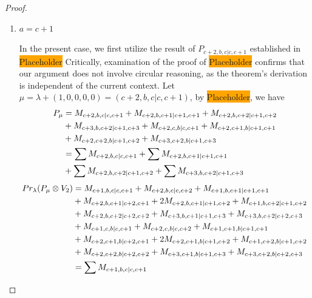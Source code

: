 \begin{proof}
\begin{enumerate}
\begin{enumerate}
      \item $a=c+1$\par
        In the present case, we first utilize the result of $P_{c+2,b,c|c,c+1}$ established in \colorbox{orange}{Placeholder} Critically, examination of the proof of \colorbox{orange}{Placeholder} confirms that our argument does not involve circular reasoning, as the theorem's derivation is independent of the current context. Let $\mu = \lambda + (1,0,0,0,0) =(c+2,b,c|c,c+1) $, by \colorbox{orange}{Placeholder}, we have
        \begin{equation}\notag
          \begin{aligned}
            P_\mu &= 
M_{c+2,b,c|c,c+1}
+M_{c+2,b,c+1|c+1,c+1}
+M_{c+2,b,c+2|c+1,c+2}\\ 
                                              &
+M_{c+3,b,c+2|c+1,c+3}
+M_{c+2,c,b|c,c+1}
+M_{c+2,c+1,b|c+1,c+1}\\ 
                                              &
+M_{c+2,c+2,b|c+1,c+2}
+M_{c+3,c+2,b|c+1,c+3}\\
                  &=
\sum M_{c+2,b,c|c,c+1}
+\sum M_{c+2,b,c+1|c+1,c+1}\\ 
                                              &
+\sum M_{c+2,b,c+2|c+1,c+2}
+\sum M_{c+3,b,c+2|c+1,c+3}
          \end{aligned}
        \end{equation}
        \begin{equation}\notag
          \begin{aligned}
            Pr_{\lambda}(P_\mu \otimes V_{2}) &=
M_{c+1,b,c|c,c+1}
+ M_{c+2,b,c|c,c+2}
+ M_{c+1,b,c+1|c+1,c+1}\\ 
                                              &
+ M_{c+2,b,c+1|c+2,c+1}
+ 2M_{c+2,b,c+1|c+1,c+2}
+ M_{c+1,b,c+2|c+1,c+2}\\ 
                                              &
+ M_{c+2,b,c+2|c+2,c+2}
+ M_{c+3,b,c+1|c+1,c+3}
+ M_{c+3,b,c+2|c+2,c+3}\\ 
                                              &
+ M_{c+1,c,b|c,c+1}
+ M_{c+2,c,b|c,c+2}
+ M_{c+1,c+1,b|c+1,c+1}\\ 
                                              &
+ M_{c+2,c+1,b|c+2,c+1}
+ 2M_{c+2,c+1,b|c+1,c+2}
+ M_{c+1,c+2,b|c+1,c+2}\\ 
                                              &
+ M_{c+2,c+2,b|c+2,c+2}
+ M_{c+3,c+1,b|c+1,c+3}
+ M_{c+3,c+2,b|c+2,c+3} \\
                                               &=
\sum M_{c+1,b,c|c,c+1}

\end{aligned}
\end{equation}
\end{enumerate}
\end{enumerate}
\end{proof}
